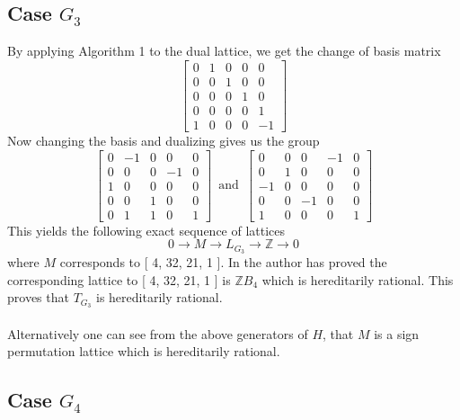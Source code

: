 \documentclass{article}
\theoremstyle{plain}
\theoremstyle{definition}
\newcommand{\Z}{\ensuremath{\mathbb{Z}}}
\newcommand{\tand}{\ensuremath{\,\,\, \text{and} \,\,\,}}
\begin{document}
\bigskip

\subsection{Case $G_3$}
By applying Algorithm 1 to the dual lattice, we get the change of basis matrix
$$
 \left[ \begin {array}{ccccc} 0&1&0&0&0\\ 0&0&1&0&0
\\ 0&0&0&1&0\\ 0&0&0&0&1
\\ 1&0&0&0&-1\end {array} \right] 
$$
Now changing the basis and dualizing gives us the group
$$
\left[ \begin {array}{cccc|c} 0&-1&0&0&0\\ 0&0&0&-1&0
\\ 1&0&0&0&0\\ 0&0&1&0&0
\\ \hline 0&1&1&0&1\end {array} \right] 
\tand
 \left[ \begin {array}{cccc|c} 0&0&0&-1&0\\ 0&1&0&0&0
\\-1&0&0&0&0\\ 0&0&-1&0&0
\\ \hline 1&0&0&0&1\end {array} \right] 
$$
This yields the following exact sequence of lattices
$$0 \longrightarrow M \longrightarrow L_{G_3} \longrightarrow \Z \longrightarrow 0$$ where $M$ corresponds to 
[ 4, 32, 21, 1 ].
In \cite{Nicole1} the author has proved the corresponding lattice to [ 4, 32, 21, 1 ] is $\mathbb{Z}B_4$ which is hereditarily rational. This proves that $T_{G_3}$ is hereditarily rational.\\
\\ Alternatively one can see from the above generators of $H$, that $M$ is a sign permutation lattice which is hereditarily rational.


\bigskip

\subsection{Case $G_4$}
\end{document}
